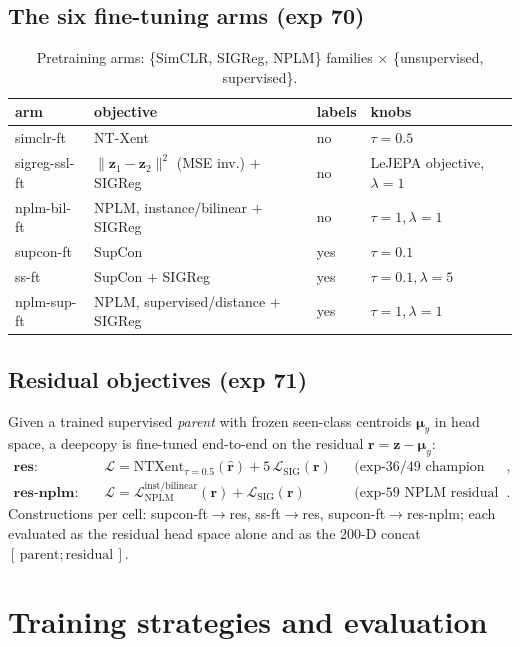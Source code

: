 \documentclass[11pt]{article}
\newcommand{\z}{\mathbf{z}}
\newcommand{\mmu}{\boldsymbol{\mu}}
\begin{document}
\subsection{The six fine-tuning arms (exp 70)}

\begin{table}[h]\centering\small
\begin{tabular}{llll}
\toprule
arm & objective & labels & knobs \\
\midrule
simclr-ft & NT-Xent & no & $\tau{=}0.5$ \\
sigreg-ssl-ft & $\lVert\z_1-\z_2\rVert^2$ (MSE inv.) $+$ SIGReg & no & LeJEPA objective, $\lambda{=}1$ \\
nplm-bil-ft & NPLM, instance/bilinear $+$ SIGReg & no & $\tau{=}1,\lambda{=}1$ \\
supcon-ft & SupCon & yes & $\tau{=}0.1$ \\
ss-ft & SupCon $+$ SIGReg & yes & $\tau{=}0.1,\lambda{=}5$ \\
nplm-sup-ft & NPLM, supervised/distance $+$ SIGReg & yes & $\tau{=}1,\lambda{=}1$ \\
\bottomrule
\end{tabular}
\caption{Pretraining arms: \{SimCLR, SIGReg, NPLM\} families
$\times$ \{unsupervised, supervised\}.}
\end{table}

\subsection{Residual objectives (exp 71)}

Given a trained supervised \emph{parent} with frozen seen-class centroids
$\mmu_y$ in head space, a deepcopy is fine-tuned end-to-end on the
residual $\mathbf r = \z - \mmu_y$:
\begin{align}
\textbf{res:}\qquad &
\mathcal L = \mathrm{NTXent}_{\tau=0.5}(\hat{\mathbf r}) + 5\,
\mathcal L_{\mathrm{SIG}}(\mathbf r)
&&\text{(exp-36/49 champion residual objective)},\\
\textbf{res-nplm:}\qquad &
\mathcal L = \mathcal L_{\mathrm{NPLM}}^{\text{inst/bilinear}}(\mathbf r)
+ \mathcal L_{\mathrm{SIG}}(\mathbf r)
&&\text{(exp-59 NPLM residual corner)}.
\end{align}
Constructions per cell: supcon-ft$\to$res, ss-ft$\to$res,
supcon-ft$\to$res-nplm; each evaluated as the residual head space alone
and as the 200-D concat $[\,\text{parent};\text{residual}\,]$.

\section{Training strategies and evaluation}
\end{document}
